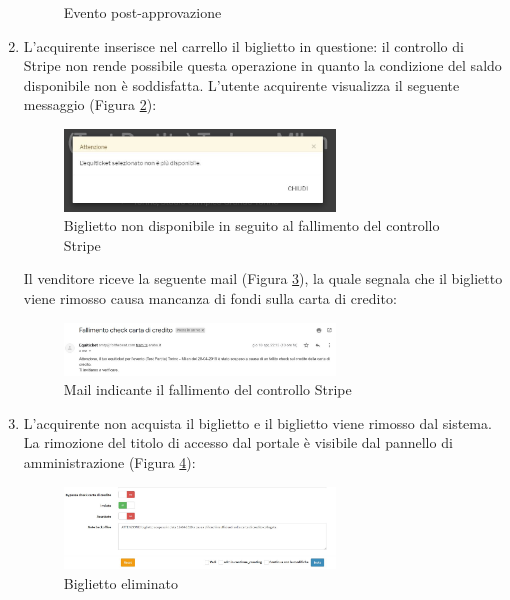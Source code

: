 \begin{enumerate}
\begin{figure}[htbp]
	\caption{Evento post-approvazione}
	\label{accettato}
\end{figure}
\item L'acquirente inserisce nel carrello il biglietto in questione: il controllo di Stripe non rende possibile questa operazione in quanto la condizione del saldo disponibile non è soddisfatta. 
L'utente acquirente visualizza il seguente messaggio (Figura \ref{testfail1}): 
\begin{figure}[htbp]
	\centering
	\includegraphics[width=0.68\textwidth]{chapter4/immagini/test2_nondisp}
	\caption{Biglietto non disponibile in seguito al fallimento del controllo Stripe}
	\label{testfail1}
\end{figure}
Il venditore riceve la seguente mail (Figura \ref{mailfail}), la quale segnala che il biglietto viene rimosso causa mancanza di fondi sulla carta di credito: 
\begin{figure}[htbp]
	\centering
	\includegraphics[width=0.68\textwidth]{chapter4/immagini/mail_fail}
	\caption{Mail indicante il fallimento del controllo Stripe}
	\label{mailfail}
\end{figure}
\item L'acquirente non acquista il biglietto e il biglietto viene rimosso dal sistema. La rimozione del titolo di accesso dal portale è visibile dal pannello di amministrazione (Figura \ref{admfail}):
\begin{figure}[htbp]
	\centering
	\includegraphics[width=0.68\textwidth]{chapter4/immagini/test2_fail2}
	\caption{Biglietto eliminato}
	\label{admfail}
\end{figure}
\end{enumerate}

